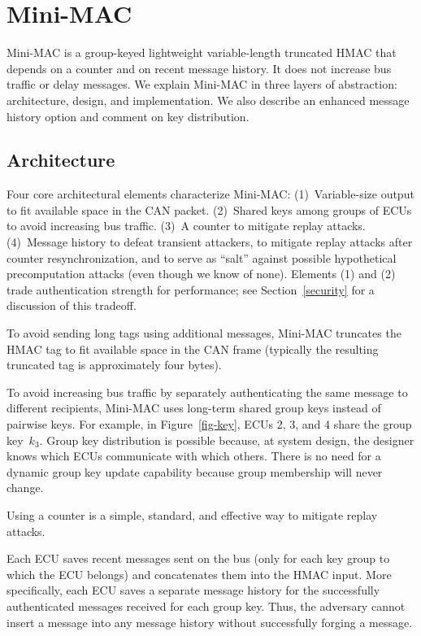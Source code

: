 \section{Mini-MAC}
\label{mini-mac}

Mini-MAC is a group-keyed lightweight variable-length truncated HMAC that
depends on a counter and on recent message history.  It does not increase
bus traffic or delay messages.  We explain Mini-MAC in three layers
of abstraction: architecture, design, and  implementation.
We also describe an enhanced message history option
and comment on key distribution.

\subsection{Architecture}
\label{arch}

Four core architectural elements characterize Mini-MAC:
(1)~Variable-size output to fit available space in the CAN packet.
(2)~Shared keys among groups of ECUs to avoid increasing bus traffic.
(3)~A counter to mitigate replay attacks.
(4)~Message history to defeat transient attackers, 
to mitigate replay attacks after counter resynchronization, 
and to serve as ``salt'' against possible hypothetical precomputation attacks 
(even though we know of none).
Elements (1) and (2) trade authentication strength for performance;  see
Section~\ref{security} for a discussion of this tradeoff.

To avoid sending long tags using additional messages, Mini-MAC truncates the
HMAC tag to fit available space in the CAN frame 
(typically the resulting truncated tag is approximately four bytes).  

To avoid increasing bus traffic by separately authenticating the same message to different recipients, 
Mini-MAC uses long-term shared group keys instead of pairwise keys.  For example, in Figure~\ref{fig-key}, ECUs
2, 3, and 4 share the group key~$k_3$.
Group key distribution is possible because, at system design, the designer knows which ECUs communicate with which others. 
There is no need for a dynamic group key update capability because group membership will never change.

Using a counter is a simple, standard, and effective way to mitigate replay attacks.  

Each ECU saves recent messages sent on the bus
(only for each key group to which the ECU belongs)
and concatenates them into the HMAC input. 
More specifically, each ECU saves a separate message history for the 
successfully authenticated messages received for each group key.  
Thus, the adversary cannot insert a message into any message history without 
successfully forging a message.

